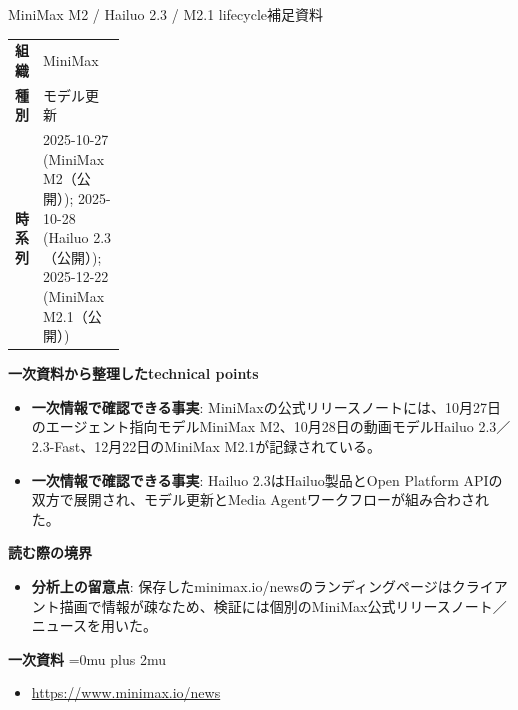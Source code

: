 \begin{technicalnote}{MiniMax M2 / Hailuo 2.3 / M2.1 lifecycle}{補足資料}
\begingroup
\begin{tabularx}{\linewidth}{@{}>{\bfseries}p{0.22\linewidth}X@{}}
組織 & MiniMax \\
種別 & モデル更新 \\
時系列 & 2025-10-27 (MiniMax M2（公開）); 2025-10-28 (Hailuo 2.3（公開）); 2025-12-22 (MiniMax M2.1（公開）) \\
\end{tabularx}
\smallskip
{\bfseries 一次資料から整理したtechnical points}
\begin{itemize}[leftmargin=1.5em,itemsep=0.35em]
\item \textbf{一次情報で確認できる事実}: MiniMaxの公式リリースノートには、10月27日のエージェント指向モデルMiniMax M2、10月28日の動画モデルHailuo 2.3／2.3-Fast、12月22日のMiniMax M2.1が記録されている。
\item \textbf{一次情報で確認できる事実}: Hailuo 2.3はHailuo製品とOpen Platform APIの双方で展開され、モデル更新とMedia Agentワークフローが組み合わされた。
\end{itemize}
\begin{minipage}{\linewidth}
{\bfseries 読む際の境界}
\begin{itemize}[leftmargin=1.5em,itemsep=0.35em]
\item \textbf{分析上の留意点}: 保存したminimax.io/newsのランディングページはクライアント描画で情報が疎なため、検証には個別のMiniMax公式リリースノート／ニュースを用いた。
\end{itemize}
\begin{samepage}
{\bfseries 一次資料}
\begingroup\sloppy
\Urlmuskip=0mu plus 2mu\relax
\begin{itemize}[leftmargin=1.5em,itemsep=0.25em]
\item {\scriptsize\url{https://www.minimax.io/news}}
\end{itemize}
\endgroup
\end{samepage}
\end{minipage}
\endgroup
\end{technicalnote}
\medskip
